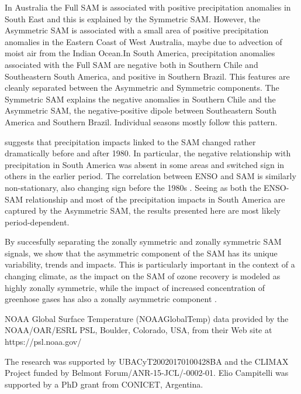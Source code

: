 \documentclass[]{ametsocV5}
\begin{document}
In Australia the Full SAM is associated with positive precipitation
anomalies in South East and this is explained by the Symmetric SAM.
However, the Asymmetric SAM is associated with a small area of positive
precipitation anomalies in the Eastern Coast of West Australia, maybe
due to advection of moist air from the Indian Ocean.In South America,
precipitation anomalies associated with the Full SAM are negative both
in Southern Chile and Southeastern South America, and positive in
Southern Brazil. This features are cleanly separated between the
Asymmetric and Symmetric components. The Symmetric SAM explains the
negative anomalies in Southern Chile and the Asymmetric SAM, the
negative-positive dipole between Southeastern South America and Southern
Brazil. Individual seasons mostly follow this pattern.

\citet{silvestri2009} suggests that precipitation impacts linked to the
SAM changed rather dramatically before and after 1980. In particular,
the negative relationship with precipitation in South America was absent
in some areas and switched sign in others in the earlier period. The
correlation between ENSO and SAM is similarly non-stationary, also
changing sign before the 1980s \citep{fogt2006, clem2013}. Seeing as
both the ENSO-SAM relationship and most of the precipitation impacts in
South America are captured by the Asymmetric SAM, the results presented
here are most likely period-dependent.

By succesfully separating the zonally symmetric and zonally symmetric
SAM signals, we show that the asymmetric component of the SAM has its
unique variability, trends and impacts. This is particularly important
in the context of a changing climate, as the impact on the SAM of ozone
recovery is modeled as highly zonally symmetric, while the impact of
increased concentration of greenhose gases has also a zonally asymmetric
component \citep{arblaster2006, simpkins2012}.

\acknowledgments

NOAA Global Surface Temperature (NOAAGlobalTemp) data provided by the
NOAA/OAR/ESRL PSL, Boulder, Colorado, USA, from their Web site at
https://psl.noaa.gov/

The research was supported by UBACyT20020170100428BA and the CLIMAX
Project funded by Belmont Forum/ANR-15-JCL/-0002-01. Elio Campitelli was
supported by a PhD grant from CONICET, Argentina.



\newpage
\end{document}
